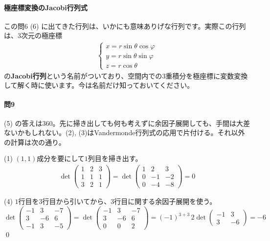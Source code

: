 \paragraph{極座標変換のJacobi行列式}

この問6 (6) に出てきた行列は、いかにも意味ありげな行列です。実際この行列は、$3$次元の極座標
\begin{align*}
\begin{cases}
x = r \sin\theta \cos\varphi \\
y = r \sin\theta \sin\varphi \\
z = r \cos\theta
\end{cases}
\end{align*}
の\textbf{Jacobi行列}という名前がついており、空間内での$3$重積分を極座標に変数変換して解く時に使います。今は名前だけ知っておいてください。

\paragraph{問9} (5) の答えは$360$。先に掃き出しても何も考えずに余因子展開しても、手間は大差ないかもしれない。(2), (3)はVandermonde行列式の応用で片付ける。それ以外の計算は次の通り。

\noindent (1) $(1, 1)$成分を要にして$1$列目を掃き出す。
\begin{align*}
\det \begin{pmatrix}
1 & 2 & 3 \\
1 & 1 & 1 \\
3 & 2 & 1
\end{pmatrix}
=
\det \begin{pmatrix}
1 & 2 & 3 \\
0 & -1 & -2 \\
0 & -4 & -8
\end{pmatrix}
= 0
\end{align*}

\noindent (4) $1$行目を$3$行目から引いてから、$3$行目に関する余因子展開を使う。
\[
\det \begin{pmatrix}
-1 & 3 & -7 \\
3 & -6 & 6 \\
-1 & 3 & -5
\end{pmatrix}
=
\det \begin{pmatrix}
-1 & 3 & -7 \\
3 & -6 & 6 \\
0 & 0 & 2
\end{pmatrix}
= (-1)^{3 + 3}\, 2
\det \begin{pmatrix}
-1 & 3 \\
3 & -6
\end{pmatrix}
= -6
\]
\qed

